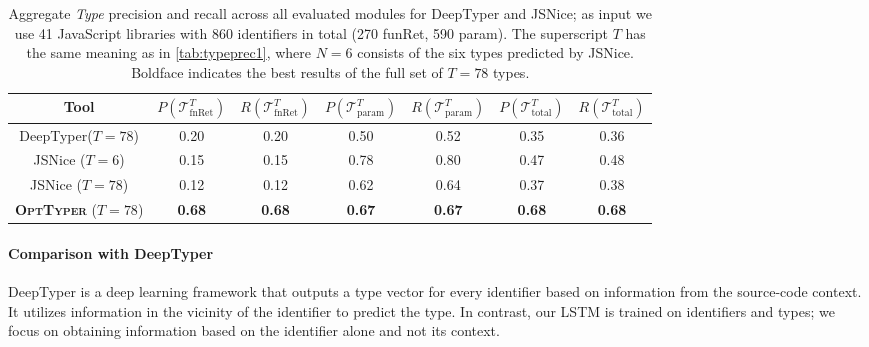 \documentclass[sigplan,10pt,review,anonymous]{acmart} %
\newcommand{\projectname}{\textsc{OptTyper}\xspace}
\theoremstyle{plain}
\theoremstyle{remark}
\theoremstyle{definition}
\begin{document}
\begin{table*}[t]
	\centering
	\caption{Aggregate \textit{Type} precision and recall across all evaluated modules for DeepTyper and JSNice; as input we use 41 JavaScript libraries with 860 identifiers in total (270 funRet, 590 param).
		The superscript $T$ has the same meaning as in \cref{tab:typeprec1}, where $N = 6$ consists of the six types predicted by JSNice.
		Boldface indicates the best results of the full set of $T=78$ types.}\label{tab:typeprec2}
	\begin{tabular}{ccccccc}
		\toprule
		Tool                                  & $P(\mathcal{T}^T_\text{fnRet})$ & $R(\mathcal{T}^T_\text{fnRet})$ & $P(\mathcal{T}^T_\text{param})$ & $R(\mathcal{T}^T_\text{param})$ & $P(\mathcal{T}^T_\text{total})$ & $R(\mathcal{T}^T_\text{total})$ \\
		\midrule
		DeepTyper\tiny{($T=78$)}              & 0.20                  & 0.20                  & 0.50                  & 0.52                  & 0.35                  & 0.36                  \\

		JSNice \tiny{($T=6$)}                 & 0.15                  & 0.15                  & 0.78                  & 0.80                  & 0.47                  & 0.48                  \\
		JSNice \tiny{($T=78$)}                & 0.12                  & 0.12                  & 0.62                  & 0.64                  & 0.37                  & 0.38                  \\
		\textbf{\projectname} \tiny{($T=78$)} & \textbf{0.68}         & \textbf{0.68}         & \textbf{0.67}         & \textbf{0.67}
		                                      & \textbf{0.68}         & \textbf{0.68}                                                                                                         \\
		\bottomrule
	\end{tabular}
\end{table*}

\paragraph{Comparison with DeepTyper}
DeepTyper is a deep learning framework that outputs a type vector for every identifier
based on information from the source-code context.
It utilizes information in the vicinity of the identifier to predict the type.
In contrast, our LSTM is trained on identifiers and types;
we focus on obtaining information based on the identifier alone and not its context.
\end{document}
